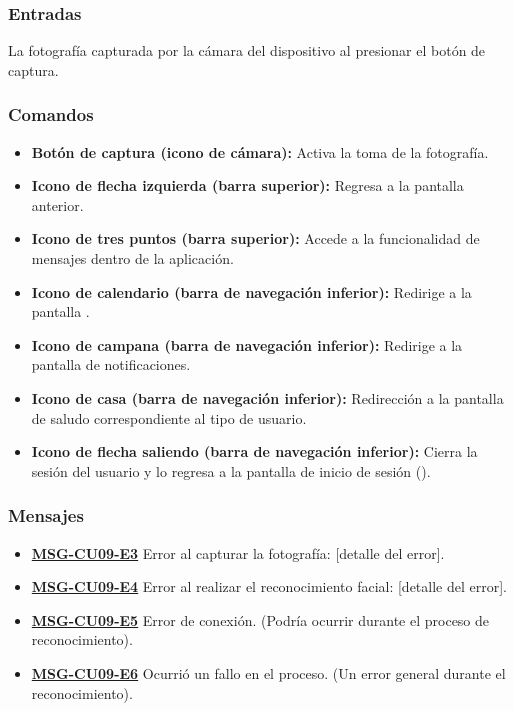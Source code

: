 \subsubsection{Entradas}
La fotografía capturada por la cámara del dispositivo al presionar el botón de captura.

\subsubsection{Comandos}
\begin{itemize}
	\item \textbf{Botón de captura (icono de cámara):} Activa la toma de la fotografía.
	\item \textbf{Icono de flecha izquierda (barra superior):} Regresa a la pantalla anterior.
	\item \textbf{Icono de tres puntos (barra superior):} Accede a la funcionalidad de mensajes dentro de la aplicación.
	\item \textbf{Icono de calendario (barra de navegación inferior):} Redirige a la pantalla .
	\item \textbf{Icono de campana (barra de navegación inferior):} Redirige a la pantalla de notificaciones.
	\item \textbf{Icono de casa (barra de navegación inferior):} Redirección a la pantalla de saludo correspondiente al tipo de usuario.
	\item \textbf{Icono de flecha saliendo (barra de navegación inferior):} Cierra la sesión del usuario y lo regresa a la pantalla de inicio de sesión ().
\end{itemize}

\subsubsection{Mensajes}
\begin{itemize}
	\item \textbf{\hyperref[msg:CU09-E3]{MSG-CU09-E3}} Error al capturar la fotografía: [detalle del error].
	\item \textbf{\hyperref[msg:CU09-E4]{MSG-CU09-E4}} Error al realizar el reconocimiento facial: [detalle del error].
	\item \textbf{\hyperref[msg:CU09-E5]{MSG-CU09-E5}} Error de conexión. (Podría ocurrir durante el proceso de reconocimiento).
	\item \textbf{\hyperref[msg:CU09-E6]{MSG-CU09-E6}} Ocurrió un fallo en el proceso. (Un error general durante el reconocimiento).
\end{itemize}